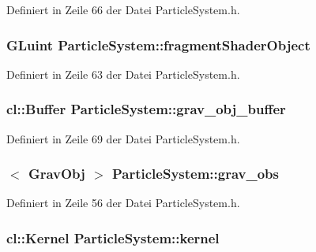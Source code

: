 Definiert in Zeile 66 der Datei Particle\-System.\-h.

\hypertarget{classParticleSystem_a251373b8c7051e8a67562d16114329fa}{
\subsubsection[{fragment\-Shader\-Object}]{\setlength{\rightskip}{0pt plus 5cm}G\-Luint Particle\-System\-::fragment\-Shader\-Object\hspace{0.3cm}{\ttfamily [private]}}}\label{classParticleSystem_a251373b8c7051e8a67562d16114329fa}


Definiert in Zeile 63 der Datei Particle\-System.\-h.

\hypertarget{classParticleSystem_a311fcb97909db73f9096b663df952dce}{
\subsubsection[{grav\-\_\-obj\-\_\-buffer}]{\setlength{\rightskip}{0pt plus 5cm}cl\-::\-Buffer Particle\-System\-::grav\-\_\-obj\-\_\-buffer\hspace{0.3cm}{\ttfamily [private]}}}\label{classParticleSystem_a311fcb97909db73f9096b663df952dce}


Definiert in Zeile 69 der Datei Particle\-System.\-h.

\hypertarget{classParticleSystem_ac4cc696d0bf251930d64b668be9c3d37}{
\subsubsection[{grav\-\_\-obs}]{$<$ {\bf Grav\-Obj} $>$ Particle\-System\-::grav\-\_\-obs}}\label{classParticleSystem_ac4cc696d0bf251930d64b668be9c3d37}


Definiert in Zeile 56 der Datei Particle\-System.\-h.

\hypertarget{classParticleSystem_a706e75308abfa8ee7ffd7661de81791b}{
\subsubsection[{kernel}]{\setlength{\rightskip}{0pt plus 5cm}cl\-::\-Kernel Particle\-System\-::kernel\hspace{0.3cm}{\ttfamily [private]}}}\label{classParticleSystem_a706e75308abfa8ee7ffd7661de81791b}


